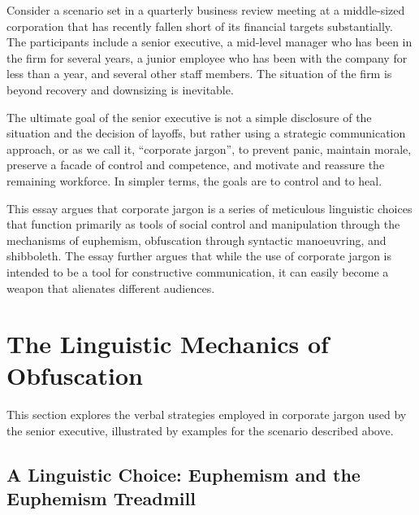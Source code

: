 \documentclass[a4paper,12pt]{article}
\begin{document}
\apatitlepage

Consider a scenario set in a quarterly business review meeting at a middle-sized corporation that has recently fallen short of its financial targets substantially.
The participants include a senior executive, a mid-level manager who has been in the firm for several years, a junior employee who has been with the company for less than a year, and several other staff members.
The situation of the firm is beyond recovery and downsizing is inevitable.

The ultimate goal of the senior executive is not a simple disclosure of the situation and the decision of layoffs, but rather using a strategic communication approach, or as we call it, ``corporate jargon'', to prevent panic, maintain morale, preserve a facade of control and competence, and motivate and reassure the remaining workforce.
In simpler terms, the goals are to control and to heal.

This essay argues that corporate jargon is a series of meticulous linguistic choices \parencite{Zamfir2024} that function primarily as tools of social control and manipulation through the mechanisms of euphemism, obfuscation through syntactic manoeuvring, and shibboleth. The essay further argues that while the use of corporate jargon is intended to be a tool for constructive communication, it can easily become a weapon that alienates different audiences.

\section{The Linguistic Mechanics of Obfuscation}

This section explores the verbal strategies employed in corporate jargon used by the senior executive, illustrated by examples for the scenario described above.

\subsection{A Linguistic Choice: Euphemism and the Euphemism Treadmill}
\end{document}
